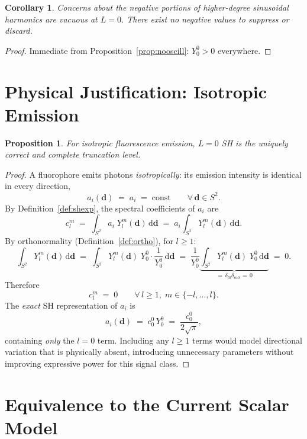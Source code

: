 \documentclass[12pt, a4paper]{article}
\theoremstyle{definition}
\theoremstyle{plain}
\newtheorem{proposition}{Proposition}[section]
\newtheorem{corollary}{Corollary}[section]
\theoremstyle{remark}
\newcommand{\Stwo}{S^2}
\newcommand{\dd}{\,\mathrm{d}}
\begin{document}
\begin{corollary}
\label{cor:noneg}
Concerns about the negative portions of higher-degree sinusoidal
harmonics are vacuous at $L=0$.  There exist no negative values to
suppress or discard.
\end{corollary}

\begin{proof}
Immediate from Proposition~\ref{prop:nooscill}: $Y_0^0>0$ everywhere.
\end{proof}

\section{Physical Justification: Isotropic Emission}

\begin{proposition}
\label{prop:physical}
For isotropic fluorescence emission, $L=0$ SH is the uniquely correct
and complete truncation level.
\end{proposition}

\begin{proof}
A fluorophore emits photons \emph{isotropically}: its emission
intensity is identical in every direction,
\[
  a_i(\mathbf{d}) \;=\; a_i \;=\; \mathrm{const}
  \qquad
  \forall\,\mathbf{d}\in\Stwo.
\]
By Definition~\ref{def:shexp}, the spectral coefficients of $a_i$ are
\[
  c_l^m
  \;=\;
  \int_{\Stwo} a_i\;Y_l^m(\mathbf{d})\dd\mathbf{d}
  \;=\;
  a_i \int_{\Stwo} Y_l^m(\mathbf{d})\dd\mathbf{d}.
\]
By orthonormality (Definition~\ref{def:ortho}), for $l\geq 1$:
\[
  \int_{\Stwo} Y_l^m(\mathbf{d})\dd\mathbf{d}
  \;=\;
  \int_{\Stwo} Y_l^m(\mathbf{d})\;Y_0^0\cdot\frac{1}{Y_0^0}\dd\mathbf{d}
  \;=\;
  \frac{1}{Y_0^0}
  \underbrace{\int_{\Stwo} Y_l^m(\mathbf{d})\;Y_0^0\dd\mathbf{d}}_{=\,\delta_{l0}\delta_{m0}\,=\,0}
  \;=\; 0.
\]
Therefore
\[
  c_l^m \;=\; 0
  \qquad
  \forall\, l\geq 1,\; m\in\{-l,\ldots,l\}.
\]
The \emph{exact} SH representation of $a_i$ is
\[
  a_i(\mathbf{d})
  \;=\;
  c_0^0\,Y_0^0
  \;=\;
  \frac{c_0^0}{2\sqrt{\pi}},
\]
containing \emph{only} the $l=0$ term.  Including any $l\geq 1$ terms
would model directional variation that is physically absent, introducing
unnecessary parameters without improving expressive power for this
signal class.
\end{proof}

\section{Equivalence to the Current Scalar Model}
\end{document}
